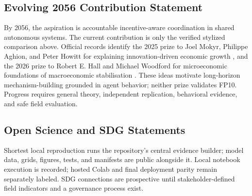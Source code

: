 \subsection*{Evolving 2056 Contribution Statement}
By 2056, the aspiration is accountable incentive-aware coordination in shared autonomous systems. The current contribution is only the verified stylized comparison above. Official records identify the 2025 prize to Joel Mokyr, Philippe Aghion, and Peter Howitt for explaining innovation-driven economic growth \cite{nobel2025growth}, and the 2026 prize to Robert E. Hall and Michael Woodford for microeconomic foundations of macroeconomic stabilisation \cite{kva2026stabilisation}. These ideas motivate long-horizon mechanism-building grounded in agent behavior; neither prize validates FP10. Progress requires general theory, independent replication, behavioral evidence, and safe field evaluation.

\subsection*{Open Science and SDG Statements}
Shortest local reproduction runs the repository's central evidence builder; model data, grids, figures, tests, and manifests are public alongside it. Local notebook execution is recorded; hosted Colab and final deployment parity remain separately labeled. SDG connections are prospective until stakeholder-defined field indicators and a governance process exist.
